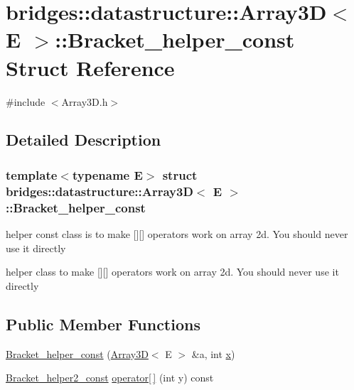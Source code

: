 \hypertarget{structbridges_1_1datastructure_1_1_array3_d_1_1_bracket__helper__const}{}\section{bridges\+:\+:datastructure\+:\+:Array3D$<$ E $>$\+:\+:Bracket\+\_\+helper\+\_\+const Struct Reference}
\label{structbridges_1_1datastructure_1_1_array3_d_1_1_bracket__helper__const}


{\ttfamily \#include $<$Array3\+D.\+h$>$}



\subsection{Detailed Description}
\subsubsection*{template$<$typename E$>$\newline
struct bridges\+::datastructure\+::\+Array3\+D$<$ E $>$\+::\+Bracket\+\_\+helper\+\_\+const}

helper const class is to make \mbox{[}\mbox{]}\mbox{[}\mbox{]} operators work on array 2d. You should never use it directly 

helper class to make \mbox{[}\mbox{]}\mbox{[}\mbox{]} operators work on array 2d. You should never use it directly \subsection*{Public Member Functions}
\begin{DoxyCompactItemize}
\item 
\hyperlink{structbridges_1_1datastructure_1_1_array3_d_1_1_bracket__helper__const_a9b87bdb88f75416d5953efe779586856}{Bracket\+\_\+helper\+\_\+const} (\hyperlink{classbridges_1_1datastructure_1_1_array3_d}{Array3D}$<$ E $>$ \&a, int \hyperlink{structbridges_1_1datastructure_1_1_array3_d_1_1_bracket__helper__const_ae7538519eb75fa07fbd06ab9754b6727}{x})
\item 
\hyperlink{structbridges_1_1datastructure_1_1_array3_d_1_1_bracket__helper2__const}{Bracket\+\_\+helper2\+\_\+const} \hyperlink{structbridges_1_1datastructure_1_1_array3_d_1_1_bracket__helper__const_a952373a0e03a47f3d588462d830efdb4}{operator\mbox{[}$\,$\mbox{]}} (int y) const
\end{DoxyCompactItemize}
